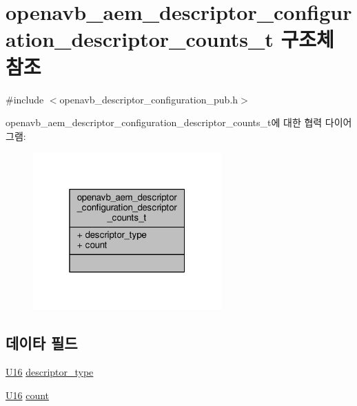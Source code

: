 \hypertarget{structopenavb__aem__descriptor__configuration__descriptor__counts__t}{}\section{openavb\+\_\+aem\+\_\+descriptor\+\_\+configuration\+\_\+descriptor\+\_\+counts\+\_\+t 구조체 참조}
\label{structopenavb__aem__descriptor__configuration__descriptor__counts__t}


{\ttfamily \#include $<$openavb\+\_\+descriptor\+\_\+configuration\+\_\+pub.\+h$>$}



openavb\+\_\+aem\+\_\+descriptor\+\_\+configuration\+\_\+descriptor\+\_\+counts\+\_\+t에 대한 협력 다이어그램\+:
\nopagebreak
\begin{figure}[H]
\begin{center}
\leavevmode
\includegraphics[width=205pt]{structopenavb__aem__descriptor__configuration__descriptor__counts__t__coll__graph}
\end{center}
\end{figure}
\subsection*{데이타 필드}
\begin{DoxyCompactItemize}
\item 
\hyperlink{openavb__types__base__pub_8h_a0a0a322d5fa4a546d293a77ba8b4a71f}{U16} \hyperlink{structopenavb__aem__descriptor__configuration__descriptor__counts__t_a1e231d7874aada5925b29affc76782cc}{descriptor\+\_\+type}
\item 
\hyperlink{openavb__types__base__pub_8h_a0a0a322d5fa4a546d293a77ba8b4a71f}{U16} \hyperlink{structopenavb__aem__descriptor__configuration__descriptor__counts__t_a0e90ee3ca6a103b4f360f92f1d1fa072}{count}
\end{DoxyCompactItemize}


